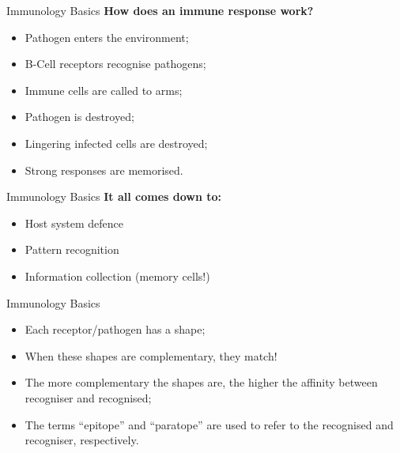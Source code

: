 \documentclass[xcolor=svgnames]{beamer}
\begin{document}
        \begin{frame}{Immunology Basics}
            \textbf{How does an immune response work?}
            
            \begin{itemize}
                \item Pathogen enters the environment;
                \pause
                \item B-Cell receptors recognise pathogens;
                \pause
                \item Immune cells are called to arms;
                \pause
                \item Pathogen is destroyed;
                \pause
                \item Lingering infected cells are destroyed;
                \pause
                \item Strong responses are memorised.
            \end{itemize}
        \end{frame}
        
        \begin{frame}{Immunology Basics}
            \textbf{It all comes down to:}
        
            \begin{itemize}
                \item Host system defence
                \item Pattern recognition
                \item Information collection (memory cells!)
            \end{itemize}
        \end{frame}
        
        \begin{frame}{Immunology Basics}
            \vspace{1em}
            \pause
            \begin{itemize}
                \item Each receptor/pathogen has a shape;
                \item When these shapes are complementary, they match!
                \item The more complementary the shapes are, the higher the affinity between recogniser and recognised;
                \item The terms ``epitope'' and ``paratope'' are used to refer to the recognised and recogniser, respectively.
            \end{itemize}
        \end{frame}
        
\end{document}
